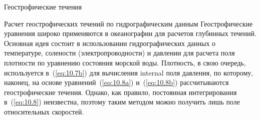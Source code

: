 \begin{chapter}{Геострофические течения}
\begin{section}{Расчет геострофических течений по гидрографическим данным}\label{sec:10.4}
Геострофические уравнения широко применяются в океанографии для
расчетов глубинных течений. Основная идея состоит в использовании
гидрографических данных о температуре, 
солености (электропроводности) и давлении для расчета поля плотности 
по уравнению состояния морской воды. Плотность, в свою очередь, 
используется в~(\ref{eq:10.7b}) для вычисления internal поля
давления, по которому, наконец, на основе уравнений~(\ref{eq:10.8a}) 
и~(\ref{eq:10.8b}) рассчитываются геострофические течения. Однако, как правило, 
постоянная интегрирования в~(\ref{eq:10.8}) неизвестна, поэтому таким методом 
можно получить лишь поле относительных скоростей.
%


\end{section}
\end{chapter}
